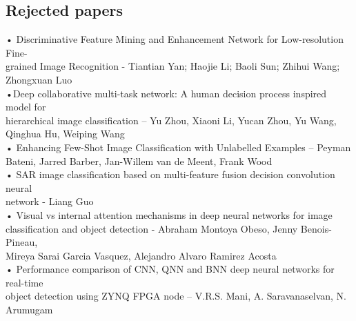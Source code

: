 \documentclass[11pt, a4paper, oneside, pdftex]{research_paper}
\begin{document}
\subsection*{Rejected papers}
\hspace{10mm} •	\quad Discriminative Feature Mining and Enhancement Network for Low-resolution Fine- \\ \null \hspace{17mm} grained Image Recognition - Tiantian Yan; Haojie Li; Baoli Sun; Zhihui Wang; \\ \null \hspace{17mm} Zhongxuan Luo \\
\null \hspace{10mm} •\quad Deep collaborative multi-task network: A human decision process inspired model for \\ \null \hspace{17mm} hierarchical image classification – Yu Zhou, Xiaoni Li, Yucan Zhou, Yu Wang, \\ \null \hspace{17mm} Qinghua Hu, Weiping Wang \\
\null \hspace{10mm} • \quad Enhancing Few-Shot Image Classification with Unlabelled Examples – Peyman \\ \null \hspace{17mm} Bateni, Jarred Barber, Jan-Willem van de Meent, Frank Wood \\
\null \hspace{10mm} • \quad SAR image classification based on multi-feature fusion decision convolution neural \\ \null \hspace{17mm} network - Liang Guo \\
\null \hspace{10mm} • \quad	Visual vs internal attention mechanisms in deep neural networks for image \\ \null \hspace{17mm} classification and object detection - Abraham Montoya Obeso, Jenny Benois-Pineau, \\ \null \hspace{17mm} Mireya Sarai Garcia Vasquez, Alejandro Alvaro Ramirez Acosta \\
\null \hspace{10mm} • \quad	Performance comparison of CNN, QNN and BNN deep neural networks for real-time \\ \null \hspace{17mm} object detection using ZYNQ FPGA node – V.R.S. Mani, A. Saravanaselvan, N. \\ \null \hspace{17mm} Arumugam \\
\end{document}

